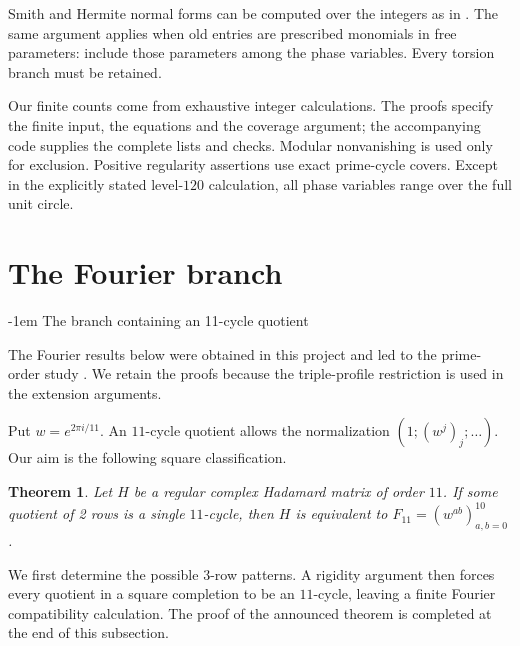 \documentclass[11pt,a4paper]{article}
\makeatletter
\newtheorem{theorem}{Theorem}[section]
\theoremstyle{plain}
\theoremstyle{definition}
\theoremstyle{plain}
\renewcommand\subsection{\@startsection{subsection}{2}{\z@}  {\medskipamount}  {-1em}  {\normalfont\normalsize\bfseries}}
\makeatother
\begin{document}
Smith and Hermite normal forms can be computed over the integers as in \cite{KB}. The same argument applies when old entries are prescribed monomials in free parameters: include those parameters among the phase variables. Every torsion branch must be retained.

Our finite counts come from exhaustive integer calculations. The proofs specify the finite input, the equations and the coverage argument; the accompanying code supplies the complete lists and checks. Modular nonvanishing is used only for exclusion. Positive regularity assertions use exact prime-cycle covers. Except in the explicitly stated level-$120$ calculation, all phase variables range over the full unit circle.

\section{The Fourier branch}\label{sec:fourier}
\subsection{The branch containing an 11-cycle quotient}\label{sec:branch_A}

The Fourier results below were obtained in this project and led to the prime-order study \cite{prime}. We retain the proofs because the triple-profile restriction is used in the extension arguments.

Put $w=e^{2\pi i/11}$. An $11$-cycle quotient allows the normalization $(1;(w^j)_j;\ldots)$. Our aim is the following square classification.

\par\addvspace{\medskipamount}\noindent
\begin{minipage}{\linewidth}
\begin{theorem}\label{n11_A_completion:main}
Let $H$ be a regular complex Hadamard matrix of order $11$. If some quotient of 2 rows is a single $11$-cycle, then $H$ is equivalent to $F_{11}=(w^{ab})_{a,b=0}^{10}$.
\end{theorem}
\end{minipage}
\par\addvspace{\medskipamount}

We first determine the possible $3$-row patterns. A rigidity argument then forces every quotient in a square completion to be an $11$-cycle, leaving a finite Fourier compatibility calculation. The proof of the announced theorem is completed at the end of this subsection.
\end{document}
